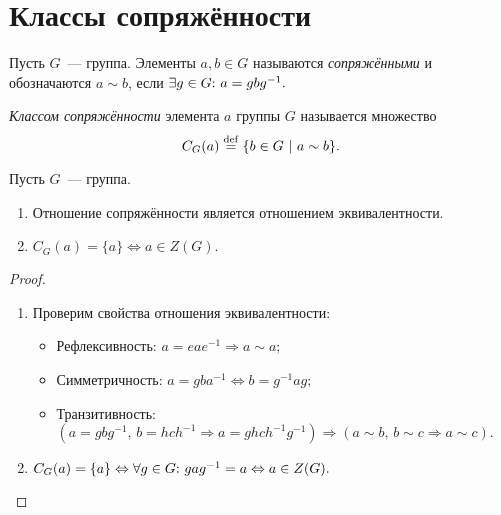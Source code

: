 \newpage
        \section{Классы сопряжённости}
        \setcounter{definition}{0}
        \begin{definition}
            Пусть $G$~--- группа. Элементы ${a,b \in G}$ называются \textit{сопряжёнными} и обозначаются ${a \sim b}$, если ${\exists g \in G{:}{ } \  a = gbg^{-1}.}$
        \end{definition}
        \begin{definition}
            \textit{Классом сопряжённости} элемента $a$ группы $G$ называется множество
            \begin{equation*}
                C_G(a) \stackrel{\mathrm{def}}{=} \{b \in G \ | \ a \sim b\}.
            \end{equation*}
        \end{definition}
        \begin{lemma}
            Пусть $G$~--- группа.
            \begin{enumerate}
            \setlength\itemsep{0.1em}
                \item Отношение сопряжённости является отношением эквивалентности.
                \item ${C_G(a) = \{a\} \Leftrightarrow a \in Z(G).}$
            \end{enumerate}
        \end{lemma}
        \begin{proof}
            \
            \begin{enumerate}
            
                \item Проверим свойства отношения эквивалентности:
                \begin{itemize}
                \setlength\itemsep{0.1em}
                    \item Рефлексивность: ${a = eae^{-1} \Rightarrow a \sim a;}$
                    \item Симметричность: ${a = gba^{-1} \Leftrightarrow b = g^{-1}ag;}$
                    \item Транзитивность: ${(a = gbg^{-1}, \, b = hch^{-1} \Rightarrow a = ghch^{-1}g^{-1}) \Rightarrow (a \sim b, \, b \sim c \Rightarrow a \sim c).}$
                \end{itemize}
                \item ${C_G(a) = \{a\} \Leftrightarrow \forall g \in G{:}{ } \  gag^{-1} = a \Leftrightarrow a \in Z(G).}$ \qedhere
            \end{enumerate}
        \end{proof}
